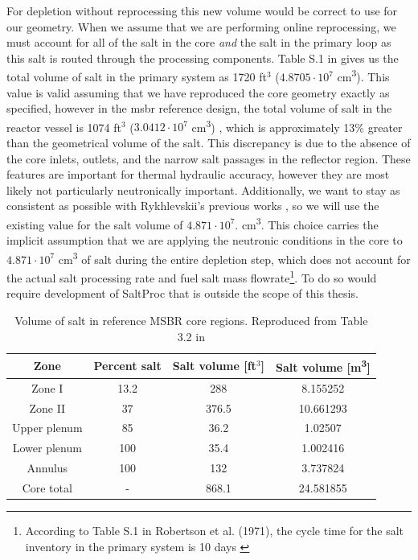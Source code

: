 For depletion without reprocessing this new volume would be correct to
use for our geometry. When we assume that we are performing online reprocessing,
we must account for all of the salt in the core {\it and} the salt in the
primary loop as this salt is routed through the processing components. Table S.1
in \cite{robertson_conceptual_1971} gives us the total volume of salt in the
primary system as  1720 ft$^{3}$ ($4.8705\cdot 10^7$ \unit{\centi\metre\cubed}).
This value is valid assuming that we have reproduced the core geometry exactly
as specified, however in the \Gls{msbr} reference design, the total volume of
salt in the reactor vessel is 1074 ft$^{3}$ ($3.0412 \cdot 10^{7}$
\unit{\centi\metre\cubed}) \cite{robertson_conceptual_1971}, which is 
approximately 13\% greater than the geometrical volume of the salt. This
discrepancy is due to the absence of the core inlets, outlets, and the narrow
salt passages in the reflector region. These features are important for thermal
hydraulic accuracy, however they are most likely not particularly neutronically
important. Additionally, we want to stay as consistent as possible with
Rykhlevskii's previous works \cite{rykhlevskii_fuel_2020}
\cite{rykhlevskii_modeling_2019}, so we will use the existing value for the salt
volume of $4.871\cdot 10^7$. \unit{\centi\metre\cubed}. This choice carries the
implicit assumption that we are applying the neutronic conditions in the core to
$4.871\cdot 10^{7}$ \unit{\centi\metre\cubed} of salt during the entire
depletion step, which does not account for the actual salt processing rate and
fuel salt mass flowrate\footnote{According to Table S.1 in Robertson et al.
(1971), the cycle time for the salt inventory in the primary system is 10 days
\cite{robertson_conceptual_1971}}. To do so would require development of
SaltProc that is outside the scope of this thesis.

\begin{table}[htpb]
    \centering
    \caption[Volume of salt in reference MSBR core regions]{Volume of salt in
reference MSBR core regions. Reproduced from Table 3.2 in
\cite{robertson_conceptual_1971}}
    \label{tab:salt-volumes}
    \begin{tabular}{|c|c|cc|}
        \hline
        Zone & Percent salt & Salt volume [ft$^3$] & Salt volume [\unit{\metre\cubed}] \\
        \hline
        Zone I & 13.2 & 288 & 8.155252 \\
        \hline
        Zone II & 37 & 376.5 & 10.661293 \\
        \hline
        Upper plenum & 85 & 36.2 & 1.02507 \\ 
        \hline
        Lower plenum & 100 & 35.4 & 1.002416 \\ 
        \hline
        Annulus & 100 &  132 & 3.737824\\
        \hline
        Core total & - & 868.1 & 24.581855 \\ 
        \hline
    \end{tabular}
\end{table}

